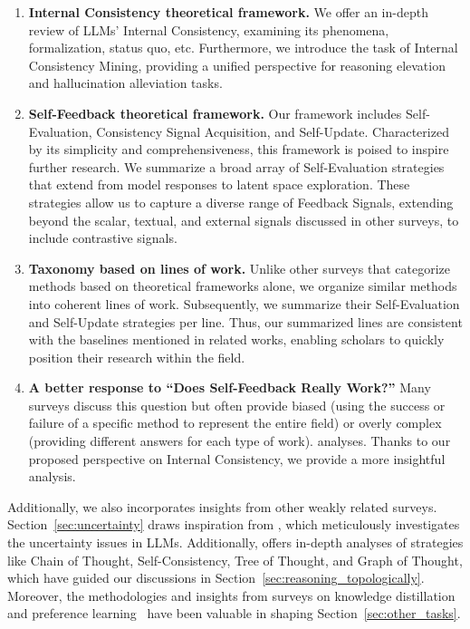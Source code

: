 \documentclass[lettersize,journal]{IEEEtran}
\begin{document}
\begin{enumerate}
    \item \textbf{Internal Consistency theoretical framework.} We offer an in-depth review of LLMs' Internal Consistency, examining its phenomena, formalization, status quo, etc. Furthermore, we introduce the task of Internal Consistency Mining, providing a unified perspective for reasoning elevation and hallucination alleviation tasks.
    \item \textbf{Self-Feedback theoretical framework.} Our framework includes Self-Evaluation, Consistency Signal Acquisition, and Self-Update. Characterized by its simplicity and comprehensiveness, this framework is poised to inspire further research. We summarize a broad array of Self-Evaluation strategies that extend from model responses to latent space exploration. These strategies allow us to capture a diverse range of Feedback Signals, extending beyond the scalar, textual, and external signals discussed in other surveys, to include contrastive signals.
    \item \textbf{Taxonomy based on lines of work.} Unlike other surveys that categorize methods based on theoretical frameworks alone, we organize similar methods into coherent lines of work. Subsequently, we summarize their Self-Evaluation and Self-Update strategies per line. Thus, our summarized lines are consistent with the baselines mentioned in related works, enabling scholars to quickly position their research within the field.
    \item \textbf{A better response to ``Does Self-Feedback Really Work?''} Many surveys discuss this question but often provide biased (using the success or failure of a specific method to represent the entire field) or overly complex (providing different answers for each type of work). analyses. Thanks to our proposed perspective on Internal Consistency, we provide a more insightful analysis.
\end{enumerate}

Additionally, we also incorporates insights from other weakly related surveys. Section~\ref{sec:uncertainty} draws inspiration from \cite{SurveyUncertainty_23_arXiv_Nankai}, which meticulously investigates the uncertainty issues in LLMs. Additionally, \cite{SurveyXofThought_24_arXiv_ETH} offers in-depth analyses of strategies like Chain of Thought, Self-Consistency, Tree of Thought, and Graph of Thought, which have guided our discussions in Section~\ref{sec:reasoning_topologically}. Moreover, the methodologies and insights from surveys on knowledge distillation~\cite{SurveyKD_24_arXiv_HKU} and preference learning~\cite{SurveyPL_24_arXiv_HIT} have been valuable in shaping Section~\ref{sec:other_tasks}.
\end{document}
